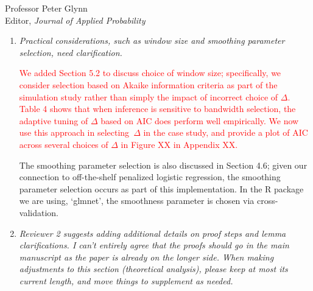 \documentclass[11pt]{letter} %
\begin{document}
\begin{letter}{Professor
	Peter Glynn\\
	Editor, {\em Journal of Applied Probability}}
\begin{enumerate}
\vspace{5mm}
We have decided that the point we were trying to raise is non-essential to the current manuscript, so we have removed the discussion of \emph{independent evolution} and its implication that $\varepsilon (t) = 0$ for all $t >0$.  The key issue we were trying to clarify is that the traditional joint model formulation in which the observed health process and time-to-event are conditionally independent given the latent process implies that the hazard function conditional on the entire observed health process depends on values after the current time.  In the case study, for example, this implies that the expected risk of a button press given the entire sensor process will depend on future activity index and electrodermal activity.  This holds unless we assume the measurement error is set to zero.  While we still think it is an important point that should be more well appreciated in the joint modeling literature, the current paper has enough content for this discussion to be omitted.  Moreover, the empirical impact seems to be limited and therefore it is better to make this point in a different manuscript and case study.
\vspace{5mm}

\item {\it Practical considerations, such as window size and smoothing parameter selection, need clarification.}

\vspace{5mm}
\textcolor{red}{
We added Section 5.2 to discuss choice of window size; specifically, we consider selection based on Akaike information criteria as part of the simulation study rather than simply the impact of incorrect choice of $\Delta$. Table 4 shows that when inference is sensitive to bandwidth selection, the adaptive tuning of $\Delta$ based on AIC does perform well empirically.  We now use this approach in selecting~$\Delta$ in the case study, and provide a plot of AIC across several choices of $\Delta$ in Figure XX in Appendix XX.}
\vspace{5mm}

The smoothing parameter selection is also discussed in Section 4.6; given our connection to off-the-shelf penalized logistic regression, the smoothing parameter selection occurs as part of this implementation.  In the R package we are using, `glmnet', the smoothness parameter is chosen via cross-validation.
\vspace{5mm}

\item {\it Reviewer 2 suggests adding additional details on proof steps and lemma clarifications. I can't entirely agree that the proofs should go in the main manuscript as the paper is already on the longer side. When making adjustments to this section (theoretical analysis), please keep at most its current length, and move things to supplement as needed.}


\end{enumerate}
\end{letter}
\end{document}
